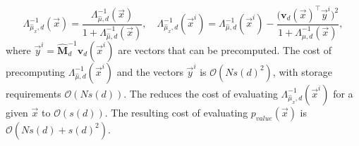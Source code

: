\documentclass[pmlr]{jmlr}%
\begin{document}
%
\begin{equation}
\Lambda^{-1}_{\hat{\mu}_x, d}(\Vec{x}) 
= \frac{\Lambda^{-1}_{\hat{\mu}, d}(\Vec{x})}{1+\Lambda^{-1}_{\hat{\mu}, d}(\Vec{x})}, \quad
\Lambda^{-1}_{\hat{\mu}_x, d}(\Vec{x}^{i}) = \Lambda^{-1}_{\hat{\mu}, d}(\Vec{x}^{i})
  - \frac{\bigl( \mathbf{v}_{d}(\Vec{x})^\intercal \Vec{y}^{i} \bigr)^2 }{1+\Lambda^{-1}_{\hat{\mu}, d}(\Vec{x})},
\end{equation}
%
where $\Vec{y}^{i} = \widehat{\mathbf{M}}_d^{-1}\mathbf{v}_{d}(\Vec{x}^{i})$ are vectors that can be precomputed.
The cost of precomputing $\Lambda^{-1}_{\hat{\mu}, d}(\Vec{x}^{i})$ and the vectors $\Vec{y}^{i}$ is $\mathcal{O}(Ns(d)^2)$, with storage requirements $\mathcal{O}(Ns(d))$.
The reduces the cost of evaluating $\Lambda^{-1}_{\hat{\mu}_x, d}(\Vec{x}^{i})$ for a given $\Vec{x}$ to $\mathcal{O}(s(d))$.
%
The resulting cost of evaluating
$p_{value}(\Vec{x})$ is $\mathcal{O}(Ns(d)+s(d)^2)$.
%
%
%
%



   
\end{document}

